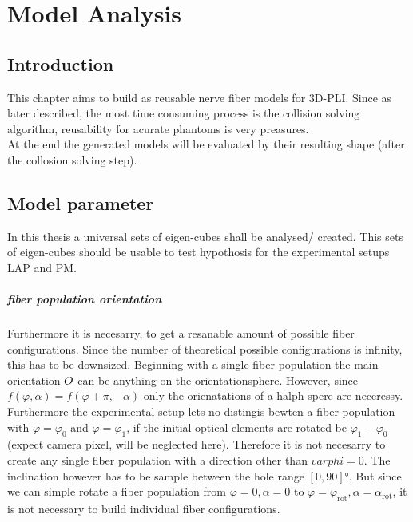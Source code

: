 \setcounter{chapter}{6}
\chapter{Model Analysis}
\label{cha:model_analysis}
% 
\section{Introduction}
% 
This chapter aims to build as reusable nerve fiber models for \ac{3D-PLI}.
Since as later described, the most time consuming process is the collision solving algorithm, reusability for acurate phantoms is very preasures.
% 
\\
% 
At the end the generated models will be evaluated by their resulting shape (after the collosion solving step).
% 
\section{Model parameter}
% 
In this thesis a universal sets of eigen-cubes shall be analysed/ created.
This sets of eigen-cubes should be usable to test hypothosis for the experimental setups \ac{LAP} and \ac{PM}.
\paragraph{fiber population orientation}
Furthermore it is necesarry, to get a resanable amount of possible fiber configurations.
Since the number of theoretical possible configurations is infinity, this has to be downsized.
Beginning with a single fiber population the main orientation $\textnormal{$O$}$ can be anything on the orientationsphere.
However, since $f(\varphi,\alpha) = f(\varphi+\pi,-\alpha)$ only the orienatations of a halph spere are neceressy.
Furthermore the experimental setup lets no distingis bewten a fiber population with $\varphi = \varphi_0$ and $\varphi = \varphi_1$, if the initial optical elements are rotated be $\varphi_1-\varphi_0$ (expect camera pixel, will be neglected here).
Therefore it is not necesarry to create any single fiber population with a direction other than $varphi = 0$.
The inclination however has to be sample between the hole range $[0,90]\si{\degree}$. But since we can simple rotate a fiber population from $\varphi=0, \alpha=0$ to $\varphi=\varphi_{\text{rot}}, \alpha=\alpha_{\text{rot}}$, it is not necessary to build individual fiber configurations.
% 
